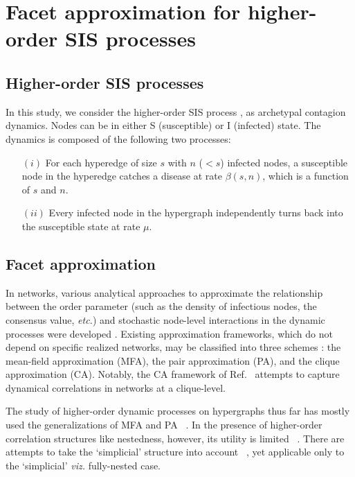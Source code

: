 \documentclass[aps,pre,twocolumn,nofootinbib,superscriptaddress,showpacs,showkeys]{revtex4-1}
\begin{document}
\section{Facet approximation for higher-order SIS processes}
\subsection{Higher-order SIS processes}
In this study, we consider the higher-order SIS process \cite{st2022influential}, as archetypal contagion dynamics.  Nodes can be in either S (susceptible) or I (infected) state. The dynamics is composed of the following two processes:

\begin{itemize}
\item[$(i)$] For each hyperedge of size $s$ with $n$ ($<s$) infected nodes, 
a susceptible node in the hyperedge catches a disease at rate $\beta(s,n)$, which is a function of $s$ and $n$.

\item[$(ii)$] Every infected node in the hypergraph independently turns back into the susceptible state  at rate $\mu$.
\end{itemize}

\subsection{Facet approximation} 
In networks, various analytical approaches to approximate the relationship between the order parameter (such as the density of infectious nodes, the consensus value, {\it etc.}) and stochastic node-level interactions in the dynamic processes were developed \cite{binary}. Existing approximation frameworks, which do not depend on specific realized networks, may be classified into three schemes \cite{r35}: the mean-field approximation (MFA), the pair approximation (PA), and the clique approximation (CA). 
Notably, the CA framework of Ref.~\cite{propagation} attempts to capture dynamical correlations in networks at a clique-level.


The study of higher-order dynamic processes on hypergraphs thus far has mostly used the generalizations of MFA and PA ~\cite{SCM,r26,r28}. In the presence of higher-order correlation structures like nestedness, however, its utility is limited ~\cite{r26}. There are attempts to take the `simplicial' structure into account ~\cite{r29,kuramoto}, yet applicable only to the `simplicial' {\it viz.} fully-nested case. 
\end{document}
